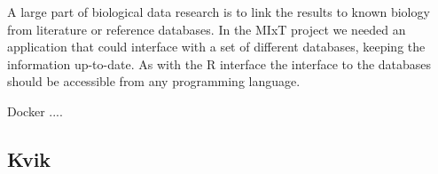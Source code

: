 A large part of biological data research is to link the results to known biology
from literature or reference databases. In the MIxT project we needed an
application that could interface with a set of different databases, keeping the
information up-to-date. As with the R interface the interface to the databases
should be accessible from any programming language. 

Docker .... 




\subsection*{Kvik}

